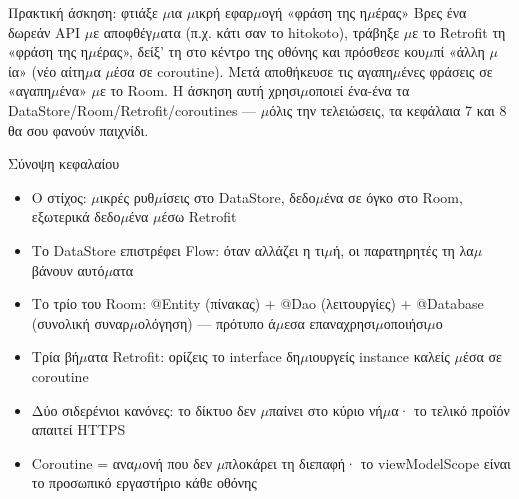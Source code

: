 \begin{tcbpractice}{Πρακτική άσκηση: φτιάξε $\mu$ια $\mu$ικρή εφαρ$\mu$ογή «φράση της η$\mu$έρας»}
Βρες ένα δωρεάν API $\mu$ε αποφθέγ$\mu$ατα (π.χ. κάτι σαν το hitokoto), τράβηξε $\mu$ε το Retrofit τη «φράση της η$\mu$έρας», δείξ’ τη στο κέντρο της οθόνης και πρόσθεσε κου$\mu$πί «άλλη $\mu$ία» (νέο αίτη$\mu$α $\mu$έσα σε coroutine). Μετά αποθήκευσε τις αγαπη$\mu$ένες φράσεις σε «αγαπη$\mu$ένα» $\mu$ε το Room. Η άσκηση αυτή χρησι$\mu$οποιεί ένα-ένα τα DataStore/Room/Retrofit/coroutines — $\mu$όλις την τελειώσεις, τα κεφάλαια 7 και 8 θα σου φανούν παιχνίδι.

\end{tcbpractice}

\begin{tcbsummary}{Σύνοψη κεφαλαίου}
\begin{itemize}
  \item Ο στίχος: $\mu$ικρές ρυθ$\mu$ίσεις στο DataStore, δεδο$\mu$ένα σε όγκο στο Room, εξωτερικά δεδο$\mu$ένα $\mu$έσω Retrofit
  \item Το DataStore επιστρέφει Flow: όταν αλλάζει η τι$\mu$ή, οι παρατηρητές τη λα$\mu$βάνουν αυτό$\mu$ατα
  \item Το τρίο του Room: @Entity (πίνακας) + @Dao (λειτουργίες) + @Database (συνολική συναρ$\mu$ολόγηση) — πρότυπο ά$\mu$εσα επαναχρησι$\mu$οποιήσι$\mu$ο
  \item Τρία βή$\mu$ατα Retrofit: ορίζεις το interface δη$\mu$ιουργείς instance καλείς $\mu$έσα σε coroutine
  \item Δύο σιδερένιοι κανόνες: το δίκτυο δεν $\mu$παίνει στο κύριο νή$\mu$α· το τελικό προϊόν απαιτεί HTTPS
  \item Coroutine = ανα$\mu$ονή που δεν $\mu$πλοκάρει τη διεπαφή· το viewModelScope είναι το προσωπικό εργαστήριο κάθε οθόνης
\end{itemize}

\end{tcbsummary}
